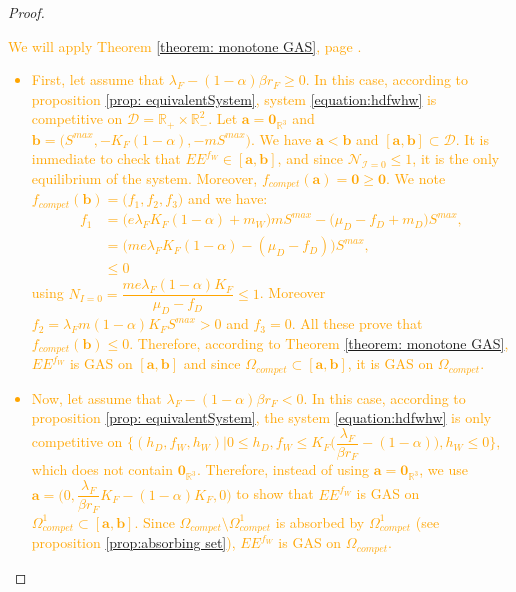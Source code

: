 \documentclass{article}
\newcommand{\lfw}{\lambda_{F}}
\newcommand{\lfw}{\lambda_{F}}
\newcommand{\cI}{\mathcal{I}}
\newcommand{\R}{\mathbb{R}}
\newcommand{\N}{\mathcal{N}}
\newcommand{\vdeux}[1]{\textcolor{orange}{#1}}
\theoremstyle{definition}
\theoremstyle{remark}
\begin{document}
\begin{proof}
\vdeux{
We will apply Theorem \ref{theorem: monotone GAS}, page \pageref{theorem: monotone GAS}.
\begin{itemize}
\item First, let assume that $\lfw -(1-\alpha) \beta r_F \geq 0$. In this case, according to proposition \ref{prop: equivalentSystem}, system \eqref{equation:hdfwhw} is competitive on $\mathcal{D} = \R_+\times \R_-^2$. Let $\mathbf{a} = \mathbf{0}_{\R^3}$ and $\mathbf{b} = \Big(S^{max}, -K_F(1-\alpha), -mS^{max}\Big)$. We have $\mathbf{a} < \mathbf{b}$ and $[\mathbf{a}, \mathbf{b}] \subset \mathcal{D}$. 
It is immediate to check that $EE^{f_W} \in [\mathbf{a}, \mathbf{b}]$, and since $\N_{\cI = 0} \leq 1$, it is the only equilibrium of the system. Moreover, $f_{compet}(\mathbf{a}) = \mathbf{0} \geq \mathbf{0}$. We note $f_{compet}(\mathbf{b}) = \Big(f_1, f_2, f_3\Big)$ and we have:
\begin{align*}
f_1 &= \Big(e\lfw K_F(1-\alpha) + m_W\Big)mS^{max} - \Big(\mu_D - f_D + m_D\Big) S^{max}, \\
&= \Big(m e\lfw K_F(1-\alpha) - (\mu_D - f_D) \Big)S^{max}, \\
& \leq 0
\end{align*}
using $N_{I= 0} = \dfrac{m e \lfw (1-\alpha)K_F}{\mu_D - f_D} \leq 1$. 
Moreover $f_2 = \lfw m (1-\alpha) K_F S^{max} > 0$ and $f_3 = 0$. All these prove that $f_{compet}(\mathbf{b}) \leq 0$. Therefore, according to Theorem \ref{theorem: monotone GAS}, $EE^{f_W}$ is GAS on $[\mathbf{a}, \mathbf{b}]$ and since $\Omega_{compet} \subset [\mathbf{a}, \mathbf{b}]$, it is GAS on $\Omega_{compet}$.
\item Now, let assume that $\lfw -(1-\alpha) \beta r_F < 0$. In this case, according to proposition \ref{prop: equivalentSystem}, the system \eqref{equation:hdfwhw} is only competitive on $\Big\{(h_D, f_W, h_W) | 0 \leq h_D, f_W \leq K_F\big(\dfrac{\lfw}{\beta r_F}-(1-\alpha)\big), h_W \leq 0 \Big\}$, which does not contain $\mathbf{0}_{\R^3}$. Therefore, instead of using $\mathbf{a}= \mathbf{0}_{\R^3}$, we use $\mathbf{a} = \Big(0, \dfrac{\lfw}{\beta r_F}K_F -	(1-\alpha)K_F, 0 \Big)$  to show that $EE^{f_W}$ is GAS on $\Omega_{compet}^1 \subset[\mathbf{a}, \mathbf{b}]$. Since $\Omega_{compet}\setminus\Omega_{compet}^1$ is absorbed by $\Omega_{compet}^1$ (see proposition \ref{prop:absorbing set}), $EE^{f_W}$ is GAS on $\Omega_{compet}$.
\end{itemize}}
\end{proof}
\end{document}
